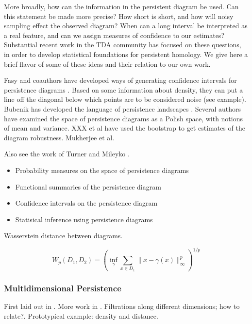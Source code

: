 More broadly, how can the information in the persistent diagram be used.
Can this statement be made more precise?
How short is short, and how will noisy sampling effect the observed diagram?
When can a long interval be interpreted as a real feature, and can we assign measures of confidence to our estimates?
Substantial recent work in the TDA community has focused on these questions, in order to develop statistical foundations for persistent homology.
We give here a brief flavor of some of these ideas and their relation to our own work.

Fasy and coauthors have developed ways of generating confidence intervals for persistence diagrams \citep{Fasy:2014}.
Based on some information about density, they can put a line off the diagonal below which points are to be considered noise (see example).
Bubenik has developed the language of persistence landscapes \cite{Bubenik:2007ux,Bubenik2015:um}.  
Several authors have examined the space of persistence diagrams as a Polish space, with notions of mean and variance.
XXX et al have used the bootstrap to get estimates of the diagram robustness.
Mukherjee et al.

Also see the work of Turner \cite{Turner:2012wb} and Mileyko \cite{Mileyko:2011jm}.

\begin{itemize}
\item Probability measures on the space of persistence diagrams
\item Functional summaries of the persistence diagram
\item Confidence intervals on the persistence diagram
\item Statisical inference using persistence diagrams
\end{itemize}

Wasserstein distance between diagrams.

\begin{equation}
W_{p}(D_{1},D_{2}) = \left( \inf_{\gamma} \sum_{x\in D_1} \|x-\gamma(x)\|^{p}_{\infty} \right)^{1/p}
\end{equation}


\subsubsection{Multidimensional Persistence}
\label{subsubsec:ph_multidim}

First laid out in \cite{Carlsson:2009b}.
More work in \cite{Lesnick:2012uv}.
Filtrations along different dimensions; how to relate?.
Prototypical example: density and distance.

